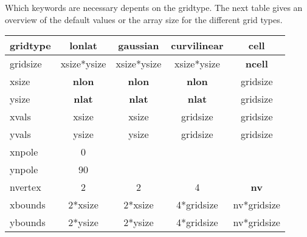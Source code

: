 \vspace{4mm}

Which keywords are necessary depents on the gridtype.
The next table gives an overview of the default values or the array size for the different
grid types.


\vspace{2mm}
\hspace{2cm}
\begin{tabular}[c]{|l||c|c|c|c|}
\hline
gridtype   & lonlat      & gaussian    & curvilinear & cell \\
\hline
\hline
gridsize   & xsize*ysize & xsize*ysize & xsize*ysize & {\bf ncell} \\
\hline
xsize      & {\bf nlon} & {\bf nlon} & {\bf nlon} & gridsize \\
\hline
ysize      & {\bf nlat} & {\bf nlat} & {\bf nlat} & gridsize \\
\hline
xvals      & xsize & xsize & gridsize & gridsize \\
\hline
yvals      & ysize & ysize & gridsize & gridsize \\
\hline
xnpole     & 0     &       &          &          \\
\hline
ynpole     & 90    &       &          &          \\
\hline
nvertex    & 2 & 2 & 4 & {\bf nv} \\
\hline
xbounds    & 2*xsize & 2*xsize & 4*gridsize & nv*gridsize \\
\hline
ybounds    & 2*ysize & 2*ysize & 4*gridsize & nv*gridsize \\
\hline
\end{tabular}

